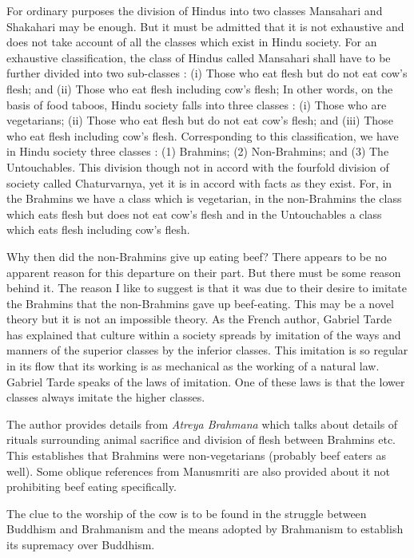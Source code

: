 \documentclass{article}
\begin{document}
\begin{shadequote}
For ordinary purposes the division of Hindus into two classes Mansahari and Shakahari may be enough. But it must be admitted that it is not exhaustive and does not take account of all the classes which exist in Hindu society. For an exhaustive classification, the class of Hindus called Mansahari shall have to be further divided into two sub-classes : (i) Those who eat flesh but do not eat cow's flesh; and (ii) Those who eat flesh including cow's flesh; In other words, on the basis of food taboos, Hindu society falls into three classes : (i) Those who are vegetarians; (ii) Those who eat flesh but do not eat cow's flesh; and (iii) Those who eat flesh including cow's flesh. Corresponding to this classification, we have in Hindu society three classes : (1) Brahmins; (2) Non-Brahmins; and (3) The Untouchables. This division though not in accord with the fourfold division of society called Chaturvarnya, yet it is in accord with facts as they exist. For, in the Brahmins we have a class which is vegetarian, in the non-Brahmins the class which eats flesh but does not eat cow's flesh and in the Untouchables a class which eats flesh including cow's flesh.

Why then did the non-Brahmins give up eating beef? There appears to be no apparent reason for this departure on their part. But there must be some reason behind it. The reason I like to suggest is that it was due to their desire to imitate the Brahmins that the non-Brahmins gave up beef-eating. This may be a novel theory but it is not an impossible theory. As the French author, Gabriel Tarde has explained that culture within a society spreads by imitation of the ways and manners of the superior classes by the inferior classes. This imitation is so regular in its flow that its working is as mechanical as the working of a natural law. Gabriel Tarde speaks of the laws of imitation. One of these laws is that the lower classes always imitate the higher classes. 
\end{shadequote}

The author provides details from \emph{Atreya Brahmana} which talks about details of rituals surrounding animal sacrifice and division of flesh between Brahmins etc. This establishes that Brahmins were non-vegetarians (probably beef eaters as well).
Some oblique references from Manusmriti are also provided about it not prohibiting beef eating specifically.

\begin{shadequote}
The clue to the worship of the cow is to be found in the struggle between Buddhism and Brahmanism and the means adopted by Brahmanism to establish its supremacy over Buddhism. 
\end{shadequote}
\end{document}
